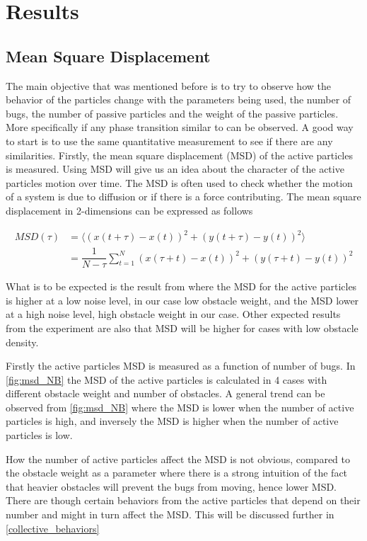 \chapter{Results}
\section{Mean Square Displacement}

The main objective that was mentioned before is to try to observe how 
the behavior of the particles change with the parameters being used, 
the number of bugs, the number of passive particles and the weight of the passive particles. 
More specifically if any phase transition similar to \cite{nilsson2017metastable} can be observed.
A good way to start is to use the same quantitative measurement to see if there are any similarities.
Firstly, the mean square displacement (MSD) of the active particles is measured. Using MSD 
will give us an idea about the character of the active particles motion over time. 
The MSD is often used to check whether the motion of a system is due to diffusion or if there is 
a force contributing. The mean square displacement in 2-dimensions can be expressed as follows

\begin{align}
	MSD(\tau)   &=  \langle (x(t+\tau)-x(t))^2 + (y(t+\tau)-y(t))^2\rangle \label{eqn:2dim_msd}\\
		    &=  \dfrac{1}{N-\tau}\sum_{t=1}^{N}\left( x(\tau+t)-x(t)\right)^2 + \left( y(\tau+t)-y(t)\right)^2
\end{align}

What is to be expected is the result from \cite{nilsson2017metastable}
where the MSD for the active particles is higher at a low noise level, in our case 
low obstacle weight, and the MSD lower at a high noise level, high obstacle weight in our case. 
Other expected results from the experiment are also that MSD will be higher for cases with low obstacle density.

Firstly the active particles MSD is measured as a function of number of bugs.
In \cref{fig:msd_NB} the MSD of the active particles is calculated in 4 cases with 
different obstacle weight and number of obstacles. A general trend can be observed 
from \cref{fig:msd_NB} where the MSD is lower when the number of active particles 
is high, and inversely the MSD is higher when the number of active particles is low.

How the number of active particles affect the MSD is not obvious, compared to the 
obstacle weight as a parameter where there is a strong intuition of the fact that 
heavier obstacles will prevent the bugs from moving, hence lower MSD. 
There are though certain behaviors from the active particles that depend on 
their number and might in turn affect the MSD. This will be discussed further in 
\cref{collective_behaviors}\\


